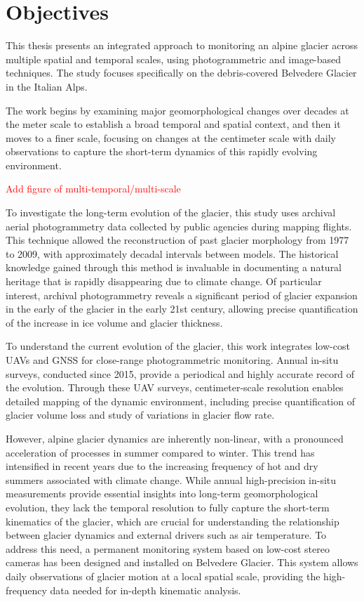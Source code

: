 \section{Objectives}

This thesis presents an integrated approach to monitoring an alpine glacier across multiple 
spatial and temporal scales, using photogrammetric and image-based techniques. 
The study focuses specifically on the debris-covered Belvedere Glacier in the Italian Alps.

The work begins by examining major geomorphological changes over decades at the meter scale to
establish a broad temporal and spatial context, and then it moves to a finer scale, 
focusing on changes at the centimeter scale with daily observations to capture the short-term dynamics of this rapidly evolving environment.

\textcolor{red}{Add figure of multi-temporal/multi-scale}

To investigate the long-term evolution of the glacier, this study uses archival aerial photogrammetry data collected by public agencies during mapping flights.
This technique allowed the reconstruction of past glacier morphology from 1977 to 2009, with 
approximately decadal intervals between models.  
The historical knowledge gained through this method is invaluable in documenting a natural
heritage that is rapidly disappearing due to climate change. 
Of particular interest, archival photogrammetry reveals a significant period of glacier expansion in the early of the glacier in the early 21st century, allowing precise quantification of the increase in ice volume and glacier thickness.

To understand the current evolution of the glacier, this work integrates low-cost UAVs and GNSS
for close-range photogrammetric monitoring.
Annual in-situ surveys, conducted since 2015, provide a periodical and highly accurate record of the evolution. 
Through these UAV surveys, centimeter-scale resolution enables detailed mapping of the dynamic environment, including precise quantification of glacier volume loss and study of variations in glacier flow rate.

However, alpine glacier dynamics are inherently non-linear, with a pronounced acceleration of processes in summer compared to winter.  
This trend has intensified in recent years due to the increasing frequency of hot and dry summers associated with climate change. 
While annual high-precision in-situ measurements provide essential insights into long-term geomorphological evolution, they lack the temporal resolution to fully capture the short-term kinematics of the glacier, which are crucial for
understanding the relationship between glacier dynamics and external drivers such as air temperature.
To address this need, a permanent monitoring system based on low-cost stereo cameras has been designed and installed on Belvedere Glacier. 
This system allows daily observations of glacier motion at a local spatial scale,
providing the high-frequency data needed for in-depth kinematic analysis.

